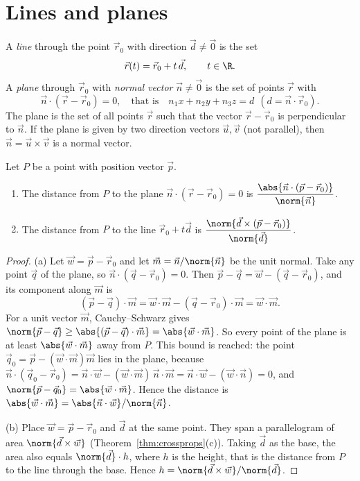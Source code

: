 \section{Lines and planes}

A \emph{line} through the point $\vec r_0$ with direction $\vec d\ne\vec 0$ is the set
\[
\vec r(t)=\vec r_0+t\,\vec d,\qquad t\in\R .
\]
A \emph{plane} through $\vec r_0$ with \emph{normal vector} $\vec n\neq\vec0$ is the set of points $\vec r$ with
\[
\vec n\cdot(\vec r-\vec r_0)=0,\quad\text{that is}\quad n_1x+n_2y+n_3z=d\ \ (d=\vec n\cdot\vec r_0).
\]
The plane is the set of all points $\vec r$ such that the vector $\vec r-\vec r_0$ is perpendicular to $\vec n$. If the plane is given by two direction vectors $\vec u,\vec v$ (not parallel), then $\vec n=\vec u\times\vec v$ is a normal vector.

\begin{theorem}[Distances]\label{thm:dist}
Let $P$ be a point with position vector $\vec p$.
\begin{enumerate}[label=(\alph*)]
  \item The distance from $P$ to the plane $\vec n\cdot(\vec r-\vec r_0)=0$ is $\displaystyle\frac{\abs{\vec n\cdot(\vec p-\vec r_0)}}{\norm{\vec n}}$.
  \item The distance from $P$ to the line $\vec r_0+t\vec d$ is $\displaystyle\frac{\norm{\vec d\times(\vec p-\vec r_0)}}{\norm{\vec d}}$.
\end{enumerate}
\end{theorem}

\begin{proof}
(a) Let $\vec w=\vec p-\vec r_0$ and let $\vec m=\vec n/\norm{\vec n}$ be the unit normal. Take any point $\vec q$ of the plane, so $\vec n\cdot(\vec q-\vec r_0)=0$. Then $\vec p-\vec q=\vec w-(\vec q-\vec r_0)$, and its component along $\vec m$ is
\[
(\vec p-\vec q)\cdot\vec m=\vec w\cdot\vec m-(\vec q-\vec r_0)\cdot\vec m=\vec w\cdot\vec m .
\]
For a unit vector $\vec m$, Cauchy--Schwarz gives $\norm{\vec p-\vec q}\ge\abs{(\vec p-\vec q)\cdot\vec m}=\abs{\vec w\cdot\vec m}$. So every point of the plane is at least $\abs{\vec w\cdot\vec m}$ away from $P$. This bound is reached: the point $\vec q_0=\vec p-(\vec w\cdot\vec m)\vec m$ lies in the plane, because $\vec n\cdot(\vec q_0-\vec r_0)=\vec n\cdot\vec w-(\vec w\cdot\vec m)\,\vec n\cdot\vec m=\vec n\cdot\vec w-(\vec w\cdot\vec n)=0$, and $\norm{\vec p-\vec q_0}=\abs{\vec w\cdot\vec m}$. Hence the distance is $\abs{\vec w\cdot\vec m}=\abs{\vec n\cdot\vec w}/\norm{\vec n}$.

(b) Place $\vec w=\vec p-\vec r_0$ and $\vec d$ at the same point. They span a parallelogram of area $\norm{\vec d\times\vec w}$ (Theorem~\ref{thm:crossprops}(c)). Taking $\vec d$ as the base, the area also equals $\norm{\vec d}\cdot h$, where $h$ is the height, that is the distance from $P$ to the line through the base. Hence $h=\norm{\vec d\times\vec w}/\norm{\vec d}$.
\end{proof}


